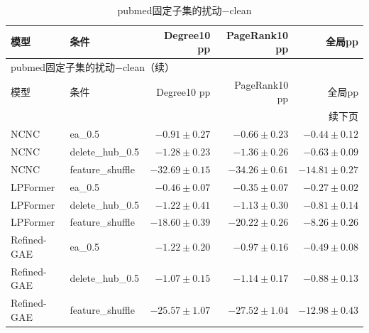 \documentclass[UTF8,a4paper,11pt,fontset=fandol]{ctexart}
\begin{document}
{\footnotesize
\setlength{\tabcolsep}{3pt}
\begin{longtable}{llrrr}
\caption{pubmed固定子集的扰动−clean}\\
\toprule
模型 & 条件 & Degree10 pp & PageRank10 pp & 全局pp \\
\midrule
\endfirsthead
\multicolumn{5}{l}{pubmed固定子集的扰动−clean（续）}\\
\toprule
模型 & 条件 & Degree10 pp & PageRank10 pp & 全局pp \\
\midrule
\endhead
\midrule\multicolumn{5}{r}{续下页}\\
\endfoot
\bottomrule\endlastfoot
NCNC & ea\_0.5 & $-0.91\pm0.27$ & $-0.66\pm0.23$ & $-0.44\pm0.12$ \\
NCNC & delete\_hub\_0.5 & $-1.28\pm0.23$ & $-1.36\pm0.26$ & $-0.63\pm0.09$ \\
NCNC & feature\_shuffle & $-32.69\pm0.15$ & $-34.26\pm0.61$ & $-14.81\pm0.27$ \\
LPFormer & ea\_0.5 & $-0.46\pm0.07$ & $-0.35\pm0.07$ & $-0.27\pm0.02$ \\
LPFormer & delete\_hub\_0.5 & $-1.22\pm0.41$ & $-1.13\pm0.30$ & $-0.81\pm0.14$ \\
LPFormer & feature\_shuffle & $-18.60\pm0.39$ & $-20.22\pm0.26$ & $-8.26\pm0.26$ \\
Refined-GAE & ea\_0.5 & $-1.22\pm0.20$ & $-0.97\pm0.16$ & $-0.49\pm0.08$ \\
Refined-GAE & delete\_hub\_0.5 & $-1.07\pm0.15$ & $-1.14\pm0.17$ & $-0.88\pm0.13$ \\
Refined-GAE & feature\_shuffle & $-25.57\pm1.07$ & $-27.52\pm1.04$ & $-12.98\pm0.43$ \\
\end{longtable}
}
\end{document}
